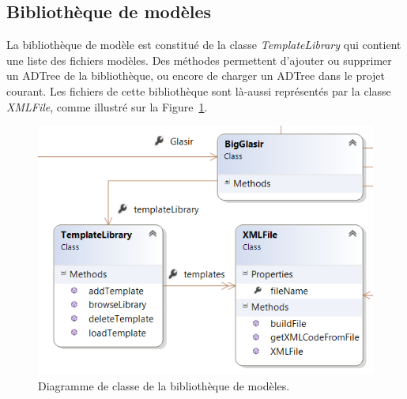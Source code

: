 	    
	\subsection{Bibliothèque de modèles}
    	\label{sec:diagClassBib}
    	La bibliothèque de modèle est constitué de la classe \emph{TemplateLibrary} qui contient une liste des fichiers modèles. Des méthodes permettent d'ajouter ou supprimer un ADTree de la bibliothèque, ou encore de charger un ADTree dans le projet courant. Les fichiers de cette bibliothèque sont là-aussi représentés par la classe \emph{XMLFile}, comme illustré sur la {\sc Figure}~\ref{fig:lib}.
    	
    	\begin{figure}[H]
	        \centering
	        \includegraphics[height=0.5\textwidth]{figure/library.png}
	        \caption{Diagramme de classe de la bibliothèque de modèles.}
	        \label{fig:lib}
	    \end{figure}